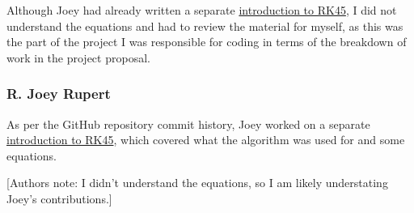\documentclass[12pt, letterpaper]{article}
\begin{document}
Although Joey had already written a separate \href{https://github.com/PMARINA/CPE593-FinalProject/blob/cccc07ca08b7014ca53ca4ae4ae105185df95d7e/RKF45_Algorithm.pdf}{introduction to RK45}, I did not understand the equations and had to review the material for myself, as this was the part of the project I was responsible for coding in terms of the breakdown of work in the project proposal. 

\subsubsection{R. Joey Rupert}
As per the GitHub repository commit history, Joey worked on a separate \href{https://github.com/PMARINA/CPE593-FinalProject/blob/cccc07ca08b7014ca53ca4ae4ae105185df95d7e/RKF45_Algorithm.pdf}{introduction to RK45}, which covered what the algorithm was used for and some equations. 

[Authors note: I didn't understand the equations, so I am likely understating Joey's contributions.]
\end{document}
